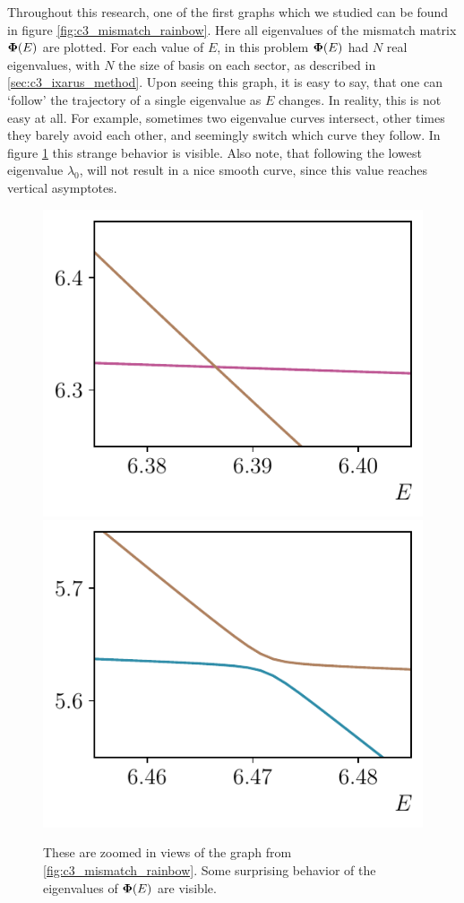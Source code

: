 Throughout this research, one of the first graphs which we studied can be found in figure \ref{fig:c3_mismatch_rainbow}. Here all eigenvalues of the mismatch matrix $\vb{\Phi}(E)$ are plotted. For each value of $E$, in this problem $\vb{\Phi}(E)$ had $N$ real eigenvalues, with $N$ the size of basis on each sector, as described in \ref{sec:c3_ixarus_method}. Upon seeing this graph, it is easy to say, that one can `follow' the trajectory of a single eigenvalue as $E$ changes. In reality, this is not easy at all. For example, sometimes two eigenvalue curves intersect, other times they barely avoid each other, and seemingly switch which curve they follow. In figure \ref{fig:c3_mismatch_rainbow_zoom} this strange behavior is visible. Also note, that following the lowest eigenvalue $\lambda_0$, will  not result in a nice smooth curve, since this value reaches vertical asymptotes.

\begin{figure}
    \begin{center}
        \includegraphics[width=.495\textwidth]{img/chapter3/mismatch_rainbow_zoomed_0.pdf}
        \hfill
        \includegraphics[width=.495\textwidth]{img/chapter3/mismatch_rainbow_zoomed_1.pdf}
    \end{center}
    \caption{These are zoomed in views of the graph from \ref{fig:c3_mismatch_rainbow}. Some surprising behavior of the eigenvalues of $\vb{\Phi}(E)$ are visible.}\label{fig:c3_mismatch_rainbow_zoom}
\end{figure}

